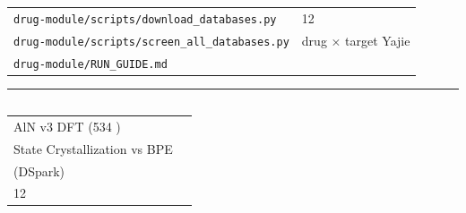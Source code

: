 \documentclass[
  12pt,
]{article}
\begin{document}
\begin{longtable}[]{@{}
  >{\raggedright\arraybackslash}p{}
  >{\raggedright\arraybackslash}p{}@{}}
\toprule\noalign{}
\begin{minipage}[b]{\linewidth}\raggedright

\end{minipage} & \begin{minipage}[b]{\linewidth}\raggedright

\end{minipage} \\
\midrule\noalign{}
\endhead
\bottomrule\noalign{}
\endlastfoot
\texttt{drug-module/scripts/download\_databases.py} & 1906 12
 \\
\texttt{drug-module/scripts/screen\_all\_databases.py} &  drug ×
target Yajie  \\
\texttt{drug-module/RUN\_GUIDE.md} &  \\
\end{longtable}

\begin{center}\rule{0.5\linewidth}{0.5pt}\end{center}

\subsection{}\label{ux672aux5305ux542bux5f85ux8865ux5145}

\begin{longtable}[]{@{}ll@{}}
\toprule\noalign{}
 &  \\
\midrule\noalign{}
\endhead
\bottomrule\noalign{}
\endlastfoot
AlN v3 DFT  (534 ) &  \\
State Crystallization vs BPE  &  \\
 (DSpark)  &  \\
12  &  \\
\end{longtable}
\end{document}
